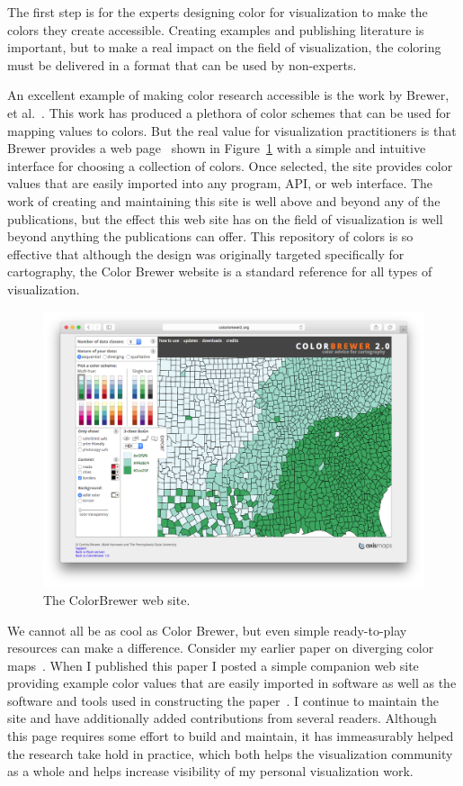 \documentclass[letterpaper,twocolumn,fleqn]{article}
\newcommand*{\lcite}[1]{~\cite{#1}}
\newcommand{\etal}{et al.\xspace}
\begin{document}
The first step is for the experts designing color for visualization to make
the colors they create accessible. Creating examples and publishing
literature is important, but to make a real impact on the field of
visualization, the coloring must be delivered in a format that can be used
by non-experts.

An excellent example of making color research accessible is the work by
Brewer, \etal\lcite{ColorBrewer}. This work has produced a plethora of
color schemes that can be used for mapping values to colors. But the real
value for visualization practitioners is that Brewer provides a web
page\lcite{ColorBrewerURL} shown in Figure~\ref{fig:ColorBrewer} with a
simple and intuitive interface for choosing a collection of colors. Once
selected, the site provides color values that are easily imported into any
program, API, or web interface. The work of creating and maintaining this
site is well above and beyond any of the publications, but the effect this
web site has on the field of visualization is well beyond anything the
publications can offer. This repository of colors is so effective that
although the design was originally targeted specifically for cartography,
the Color Brewer website is a standard reference for all types of
visualization.

\begin{figure}[htb]
  \centering
  \includegraphics[width=\linewidth]{images/ColorBrewer}
  \caption{The ColorBrewer web site.}
  \label{fig:ColorBrewer}
\end{figure}

We cannot all be as cool as Color Brewer, but even simple ready-to-play
resources can make a difference. Consider my earlier paper on diverging
color maps\lcite{Moreland2009}. When I published this paper I posted a
simple companion web site providing example color values that are easily
imported in software as well as the software and tools used in constructing
the paper\lcite{DivergingColorMapURL}. I continue to maintain the site and
have additionally added contributions from several readers. Although this
page requires some effort to build and maintain, it has immeasurably helped
the research take hold in practice, which both helps the visualization
community as a whole and helps increase visibility of my personal
visualization work.
\end{document}
